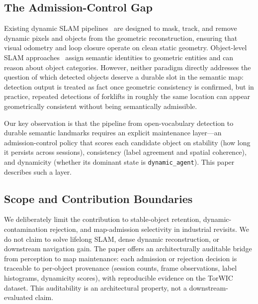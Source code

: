 \documentclass[journal]{IEEEtran}
\begin{document}
\subsection{The Admission-Control Gap}
\label{sec:admission_gap}

Existing dynamic SLAM pipelines~\cite{bescos2018dynaslam} are designed to mask, track, and remove dynamic pixels and objects from the geometric reconstruction, ensuring that visual odometry and loop closure operate on clean static geometry. Object-level SLAM approaches~\cite{yang2019cubeslam,peng2023openscene,jatavallabhula2023conceptfusion} assign semantic identities to geometric entities and can reason about object categories. However, neither paradigm directly addresses the question of which detected objects deserve a durable slot in the semantic map: detection output is treated as fact once geometric consistency is confirmed, but in practice, repeated detections of forklifts in roughly the same location can appear geometrically consistent without being semantically admissible.

Our key observation is that the pipeline from open-vocabulary detection to durable semantic landmarks requires an explicit maintenance layer---an admission-control policy that scores each candidate object on stability (how long it persists across sessions), consistency (label agreement and spatial coherence), and dynamicity (whether its dominant state is \texttt{dynamic\_agent}). This paper describes such a layer.

\subsection{Scope and Contribution Boundaries}
\label{sec:scope}

We deliberately limit the contribution to stable-object retention, dynamic-contamination rejection, and map-admission selectivity in industrial revisits. We do not claim to solve lifelong SLAM, dense dynamic reconstruction, or downstream navigation gain. The paper offers an architecturally auditable bridge from perception to map maintenance: each admission or rejection decision is traceable to per-object provenance (session counts, frame observations, label histograms, dynamicity scores), with reproducible evidence on the TorWIC dataset. This auditability is an architectural property, not a downstream-evaluated claim.

\end{document}
